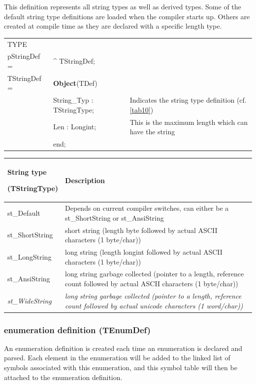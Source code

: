 \documentclass [a4paper,12pt]{article}
\begin{document}
This definition represents all string types as well as derived types. Some
of the default string type definitions are loaded when the compiler starts
up. Others are created at compile time as they are declared with a specific
length type.

\begin{tabular*}{6.5in}{|l@{\extracolsep{\fill}}lp{8cm}|}
\hline
\textsf{TYPE}& & \\
\xspace pStringDef = & \^{}  TStringDef; & \\
\xspace \textsf{TStringDef} = & \textbf{Object}(TDef) & \\
&\textsf{String{\_}Typ : TStringType;}&
	Indicates the string type definition (cf. \ref{tab10}) \\
&\textsf{Len : Longint;}&
	This is the maximum length which can have the string \\
&\textsf{end;}& \\
\hline
\end{tabular*}

\begin{longtable}{|l|p{10cm}|}
\hline
String type \par (TStringType) & Description \\
\hline
\endhead
\hline
\endfoot
\textsf{st{\_}Default}&
	Depends on current compiler switches, can either be a
	st{\_}ShortString or st{\_}AnsiString \\
\textsf{st{\_}ShortString}&
	short string (length byte followed by actual ASCII characters (1
	byte/char)) \\
\textsf{st{\_}LongString}&
	long string (length longint followed by actual ASCII characters (1
	byte/char)) \\
\textsf{st{\_}AnsiString}&
	long string garbage collected (pointer to a length, reference count
	followed by actual ASCII characters (1 byte/char)) \\
\textsf{\textit{st{\_}WideString}}&
	\textit{long string garbage collected (pointer to a length,
	reference count followed by actual unicode characters (1
	word/char))} \\
\end{longtable}

\subsubsection{enumeration definition (TEnumDef)}
\label{subsubsec:mylabel9}

An enumeration definition is created each time an enumeration is declared
and parsed. Each element in the enumeration will be added to the linked list
of symbols associated with this enumeration, and this symbol table will then
be attached to the enumeration definition.
\end{document}
